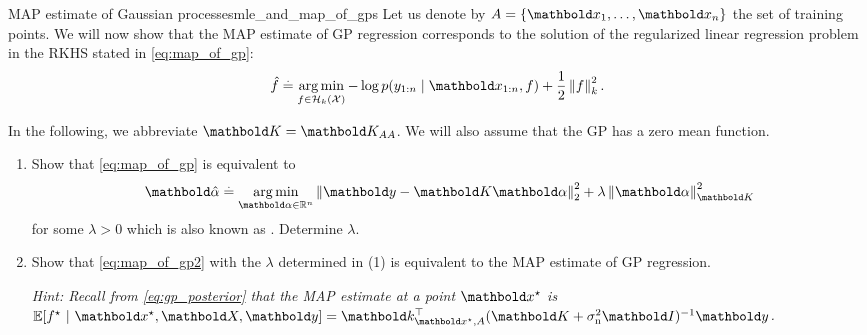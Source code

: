 \begin{nexercise}{MAP estimate of Gaussian processes}{mle_and_map_of_gps}
  Let us denote by $A = \{\vx_1, \dots, \vx_n\}$ the set of training points.
  We will now show that the MAP estimate of GP regression corresponds to the solution of the regularized linear regression problem in the RKHS stated in \cref{eq:map_of_gp}: \begin{align*}
    \hat{f} \defeq \argmin_{f \in \spH_k(\spX)} - \log p(y_{1:n} \mid \vx_{1:n}, f) + \frac{1}{2} \norm{f}_k^2.
  \end{align*}

  In the following, we abbreviate $\mK = \mK_{AA}$.
  We will also assume that the GP has a zero mean function.
  \begin{enumerate}
    \item Show that \cref{eq:map_of_gp} is equivalent to \begin{align}
      \valphahat \defeq \argmin_{\valpha \in \R^n} \norm{\vy - \mK \valpha}_2^2 + \lambda \norm{\valpha}_{\mK}^2 \label{eq:map_of_gp2}
    \end{align} for some $\lambda > 0$ which is also known as .
    Determine $\lambda$.

    \item Show that \cref{eq:map_of_gp2} with the $\lambda$ determined in (1) is equivalent to the MAP estimate of GP regression.
    \par\textit{Hint: Recall from \cref{eq:gp_posterior} that the MAP estimate at a point $\vxs$ is $\E{\fs}[\vxs, \mX, \vy] = \transpose{\vk_{\vxs,A}}\inv{(\mK + \sigman^2 \mI)}\vy$.}
  \end{enumerate}
\end{nexercise}


